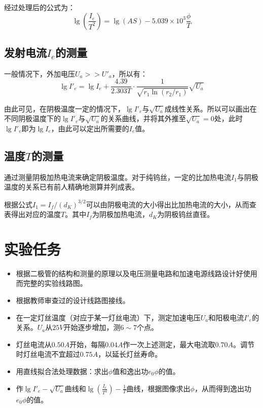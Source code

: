 \documentclass[a4paper]{article}
\begin{document}
\par 经过处理后的公式为：
$$\lg(\frac{I_e}{T^2})=\lg(AS)-5.039\times 10^3\frac{\phi}{T}$$

\subsection{发射电流$I_e$的测量}

\par 一般情况下，外加电压$U_a>>U'_a$，所以有：
$$\lg I'_e=\lg I_e+\frac{4.39}{2.303T}\cdot\frac{1}{\sqrt{r_1\ln(r_2/r_1)}}\sqrt{U_a}$$
\par 由此可见，在阴极温度一定的情况下，$\lg I'_e$与$\sqrt{U_a}$成线性关系。所以可以画出在不同阴极温度下的$\lg I'_e$与$\sqrt{U_a}$的关系曲线，并将其外推至$\sqrt{U_a}=0$处，此时$\lg I'_e$即为$\lg I_e$，由此可以定出所需要的$I_e$值。

\subsection{温度$T$的测量}

\par 通过测量阴极加热电流来确定阴极温度。对于纯钨丝，一定的比加热电流$I_1$与阴极温度的关系已有前人精确地测算并列成表。

\par 根据公式$I_1=I_f/(d_K)^{3/2}$可以由阴极电流的大小得出比加热电流的大小，从而查表得出对应的温度$T$。其中$I_f$为阴极加热电流，$d_K$为阴极钨丝直径。

\section{实验任务}

\begin{itemize}
	\item 根据二极管的结构和测量的原理以及电压测量电路和加速电源线路设计好使用而完整的实验线路图。
	\item 根据教师审查过的设计线路图接线。
	\item 在一定灯丝温度（对应于某一灯丝电流）下，测定加速电压$U_a$和阳极电流$I'_e$的关系。$U_a$从$25V$开始逐步增加，测$6\sim7$个点。
	\item 灯丝电流从$0.50A$开始，每隔$0.04A$作一次上述测定，最大电流取$0.70A$。调节时灯丝电流不宜超过$0.75A$，以延长灯丝寿命。
	\item 用直线拟合法处理数据：求出$\phi$值和逸出功$e_0\phi$的值。
	\item 作$\lg I'_e-\sqrt{U_a}$曲线和$\lg(\frac{I_e}{T^2})-\frac{1}{T}$曲线，根据图像求出$\phi$，从而得到逸出功$e_0\phi$的值。
\end{itemize}
\end{document}
